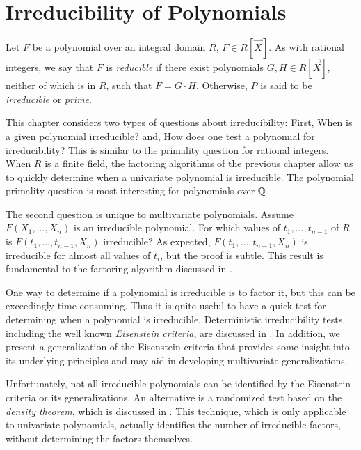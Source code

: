 \chapter{Irreducibility of Polynomials}
\label{Irred:Chap}

Let $F$ be a polynomial over an integral domain $R$, $F \in
R[\vec{X}]$.  As with rational integers, we say that $F$ is {\em
reducible} if there exist polynomials $G,
H \in R[\vec{X}]$, neither of which is in $R$, such that $F = G\cdot
H$.  Otherwise, $P$ is said to be {\em
irreducible} or {\em
prime}.

This chapter considers two types of questions about irreducibility:
First, When is a given polynomial irreducible? and, How does one test 
a polynomial for irreducibility?  This is similar to the
primality question for rational integers.  When $R$ is a finite field,
the factoring algorithms of the previous chapter allow us to quickly
determine when a univariate polynomial is irreducible.  The polynomial
primality question is most interesting for polynomials over $\mathbb{Q}$.

The second question is unique to multivariate polynomials.  Assume
$F(X_1, \ldots, X_n)$ is an irreducible polynomial.  For which values
of $t_1, \ldots, t_{n-1}$ of $R$ is $F(t_1, \ldots, t_{n-1}, X_n)$
irreducible?  As expected, $F(t_1, \ldots, t_{n-1}, X_n)$ is
irreducible for almost all values of $t_i$, but the proof is subtle.
This result is fundamental to the factoring algorithm discussed in
.

One way to determine if a polynomial is irreducible is to factor it,
but this can be exceedingly time consuming.  Thus it is quite useful
to have a quick test for determining when a polynomial is irreducible.
Deterministic irreducibility tests, including the well known {\em
Eisenstein criteria\/}, are discussed in .  In
addition, we present a generalization of the Eisenstein criteria that
provides some insight into its underlying principles and may aid in
developing multivariate generalizations.

Unfortunately, not all irreducible polynomials can be identified by
the Eisenstein criteria or its generalizations. An alternative is a
randomized test based on the {\em {\Chebotarev} density theorem},
which is discussed in .  This technique, which
is only applicable to univariate polynomials, actually identifies the
number of irreducible factors, without determining the factors
themselves.

